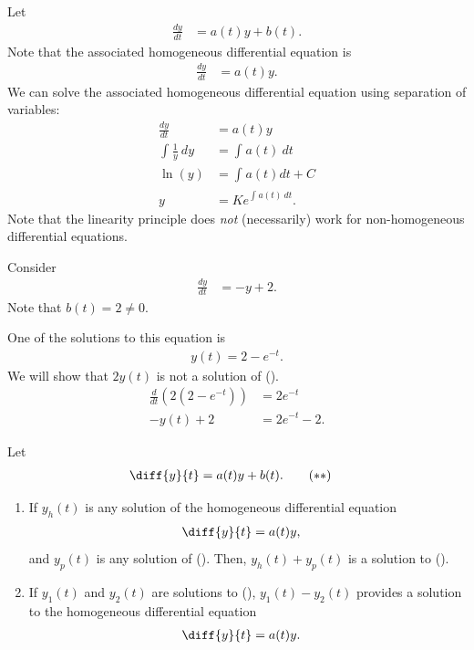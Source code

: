 \documentclass[10pt]{mypackage}
\begin{document}
\begin{example}
  Let
  \begin{align*}
    \frac{dy}{dt} &= a(t) y + b(t).
  \end{align*}
  Note that the associated homogeneous differential equation is
  \begin{align*}
    \frac{dy}{dt} &= a(t) y.
  \end{align*}
  We can solve the associated homogeneous differential equation using separation of variables:
  \begin{align*}
    \frac{dy}{dt} &= a(t) y \\
    \int_{}^{} \frac{1}{y}\:dy &= \int_{}^{} a(t)\:dt\\
    \ln (y) &= \int_{}^{}a(t) dt + C\\
    y &= Ke^{\int_{}^{} a(t)\:dt}. \tag*{$C\in\R$}
  \end{align*}
  Note that the linearity principle does \textit{not} (necessarily) work for non-homogeneous differential equations.
\end{example}
\begin{example}
  Consider
  \begin{align*}
    \frac{dy}{dt} &= -y + 2. \tag*{(\textasteriskcentered)}
  \end{align*}
  Note that $b(t) = 2 \neq 0$.\newline

  One of the solutions to this equation is
  \begin{align*}
    y(t) = 2 - e^{-t}.
  \end{align*}
  We will show that $2y(t)$ is not a solution of (\textasteriskcentered).
  \begin{align*}
    \frac{d}{dt}\left(2\left(2-e^{-t}\right)\right)  &= 2e^{-t}\\
    -y(t) + 2 &= 2e^{-t} - 2.
  \end{align*}
\end{example}
\begin{theorem}
  Let
  \begin{align*}
    \diff{y}{t} &= a(t) y + b(t).\tag*{(\textasteriskcentered\textasteriskcentered)}
  \end{align*}
  \begin{enumerate}[(1)]
    \item If $y_h(t)$ is any solution of the homogeneous differential equation
      \begin{align*}
        \diff{y}{t} &= a(t) y,
      \end{align*}
      and $y_p(t)$ is any solution of (\textasteriskcentered\textasteriskcentered). Then, $y_h(t) + y_p(t)$ is a solution to (\textasteriskcentered\textasteriskcentered).
    \item If $y_1(t)$ and $y_2(t)$ are solutions to (\textasteriskcentered\textasteriskcentered), $y_1(t) - y_2(t)$ provides a solution to the homogeneous differential equation
      \begin{align*}
        \diff{y}{t} &= a(t) y.
      \end{align*}
  \end{enumerate}
\end{theorem}
\end{document}
